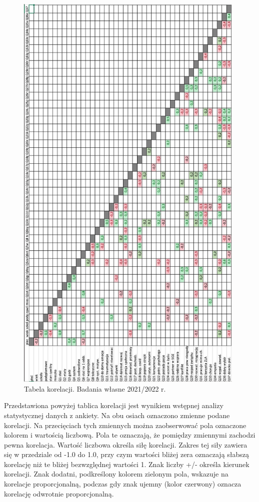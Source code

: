 \documentclass[a4paper,12pt,twoside,openright]{mwrep}
\begin{document}
\begin{appendices}
\begin{figure}[H]
\centering
\includegraphics[width=11cm]{wyniki/crosstable90}
\caption{Tabela korelacji. Badania własne 2021/2022 r.}
\label{rys:crosstable}
\end{figure}

Przedstawiona powyżej tablica korelacji jest wynikiem wstępnej analizy statystycznej danych z ankiety. Na obu osiach oznaczono zmienne podane korelacji. Na przecięciach tych zmiennych można zaobserwować pola oznaczone kolorem i wartością liczbową. Pola te oznaczają, że pomiędzy zmiennymi zachodzi pewna korelacja. 
Wartość liczbowa określa siłę korelacji. Zakres tej siły zawiera się w przedziale od -1.0 do 1.0, przy czym wartości bliżej zera oznaczają słabszą korelację niż te bliżej bezwzględnej wartości 1. Znak liczby +/- określa kierunek korelacji. Znak dodatni, podkreślony kolorem zielonym pola, wskazuje na korelacje proporcjonalną, podczas gdy znak ujemny (kolor czerwony) oznacza korelację odwrotnie proporcjonalną.

\end{appendices}


\end{document}
